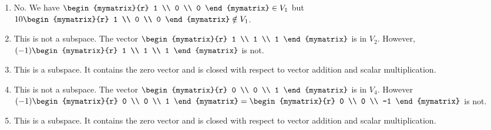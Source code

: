 \begin{ex}
  \begin{sol}
    \begin{enumerate}
    \item
      No. We have $\begin{mymatrix}{r}
        1 \\ 0 \\ 0
      \end{mymatrix} \in V_1$ but $10\begin{mymatrix}{r}
        1 \\ 0 \\ 0
      \end{mymatrix} \notin V_1$.
    \item
      This is not a subspace. The vector $\begin{mymatrix}{r}
        1 \\ 1 \\ 1
      \end{mymatrix}$
      is in $V_2$. However, $(-1) \begin{mymatrix}{r}
        1 \\ 1 \\ 1
      \end{mymatrix}$ is not.
    \item This is a subspace. It contains the zero vector and is
      closed with respect to vector addition and scalar
      multiplication.
    \item
      This
      is not a subspace. The vector $\begin{mymatrix}{r}
        0 \\ 0 \\ 1
      \end{mymatrix}$ is in $V_4$. However $(-1) \begin{mymatrix}{r}
        0 \\ 0 \\ 1
      \end{mymatrix}  = \begin{mymatrix}{r}
        0 \\ 0 \\ -1
      \end{mymatrix}$ is not.
    \item This is a subspace. It contains the zero vector and is
      closed with respect to vector addition and scalar
      multiplication.
    \end{enumerate}
  \end{sol}
\end{ex}

